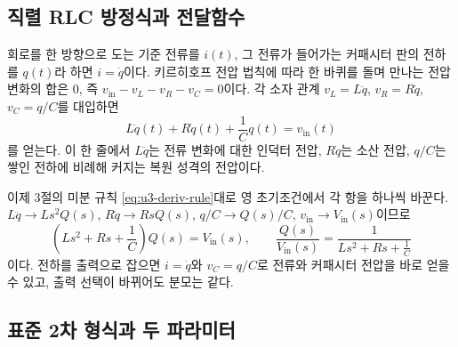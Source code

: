 \subsection{직렬 RLC 방정식과 전달함수}

회로를 한 방향으로 도는 기준 전류를 $i(t)$, 그 전류가 들어가는 커패시터
판의 전하를 $q(t)$라 하면 $i = \dot{q}$이다.
키르히호프 전압 법칙에 따라 한 바퀴를 돌며 만나는 전압 변화의 합은 0,
즉 $v_{\mathrm{in}} - v_L - v_R - v_C = 0$이다.
각 소자 관계 $v_L = L\ddot{q}$, $v_R = R\dot{q}$, $v_C = q/C$를 대입하면
\begin{equation}
  L\ddot{q}(t) + R\dot{q}(t) + \frac{1}{C}q(t) = v_{\mathrm{in}}(t)
  \label{eq:u3-rlc-ode}
\end{equation}
를 얻는다.
이 한 줄에서 $L\ddot{q}$는 전류 변화에 대한 인덕터 전압, $R\dot{q}$는
소산 전압, $q/C$는 쌓인 전하에 비례해 커지는 복원 성격의 전압이다.

이제 3절의 미분 규칙 \eqref{eq:u3-deriv-rule}대로 영 초기조건에서 각 항을
하나씩 바꾼다.
$L\ddot{q} \to L s^2 Q(s)$, $R\dot{q} \to R s Q(s)$,
$q/C \to Q(s)/C$, $v_{\mathrm{in}} \to V_{\mathrm{in}}(s)$이므로
\begin{equation}
  \left(L s^2 + R s + \frac{1}{C}\right) Q(s) = V_{\mathrm{in}}(s),
  \qquad
  \frac{Q(s)}{V_{\mathrm{in}}(s)} = \frac{1}{L s^2 + R s + \frac{1}{C}}
  \label{eq:u3-rlc-tf}
\end{equation}
이다.
전하를 출력으로 잡으면 $i = \dot{q}$와 $v_C = q/C$로 전류와 커패시터
전압을 바로 얻을 수 있고, 출력 선택이 바뀌어도 분모는 같다.

\subsection{표준 2차 형식과 두 파라미터}

